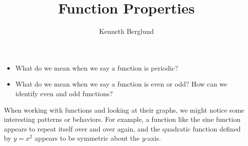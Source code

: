 \documentclass[nooutcomes]{ximera}
\author{Kenneth Berglund}
\title{Function Properties}
\begin{document}
\begin{abstract}
  
\end{abstract}
\maketitle



\begin{motivatingQuestions}\begin{itemize}
\item What do we mean when we say a function is periodic?
\item What do we mean when we say a function is even or odd? How can we identify even and odd functions?
\end{itemize}\end{motivatingQuestions}



When working with functions and looking at their graphs, we might notice some interesting patterns or behaviors. For example, a function like the sine function appears to repeat itself over and over again, and the quadratic function defined by $y = x^2$ appears to be symmetric about the $y$-axis. 

\begin{image}

\end{image}
\end{document}
